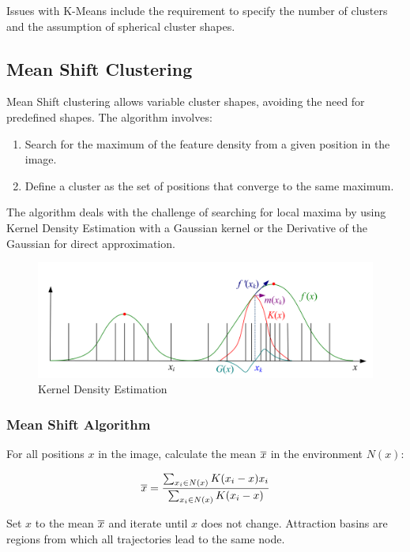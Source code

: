 Issues with K-Means include the requirement to specify the number of clusters and the assumption of spherical cluster shapes.

\subsection{Mean Shift Clustering}

Mean Shift clustering allows variable cluster shapes, avoiding the need for predefined shapes. The algorithm involves:

\begin{enumerate}
	\item Search for the maximum of the feature density from a given position in the image.
	\item Define a cluster as the set of positions that converge to the same maximum.
\end{enumerate}

The algorithm deals with the challenge of searching for local maxima by using Kernel Density Estimation with a Gaussian kernel
or the Derivative of the Gaussian for direct approximation.

\begin{figure}[h]
	\centering
	\includegraphics[width=0.7\linewidth]{img/kernel_density_estimation}
	\caption{Kernel Density Estimation}
\end{figure}

\subsubsection{Mean Shift Algorithm}

For all positions $x$ in the image, calculate the mean $\overline{x}$ in the environment $N(x)$:

\[
\overline{x} = \frac{\sum_{x_i \in N(x)} K(x_i - x) x_i}{\sum_{x_i \in N(x)} K(x_i - x)}
\]

Set $x$ to the mean $\overline{x}$ and iterate until $x$ does not change.
Attraction basins are regions from which all trajectories lead to the same node.

